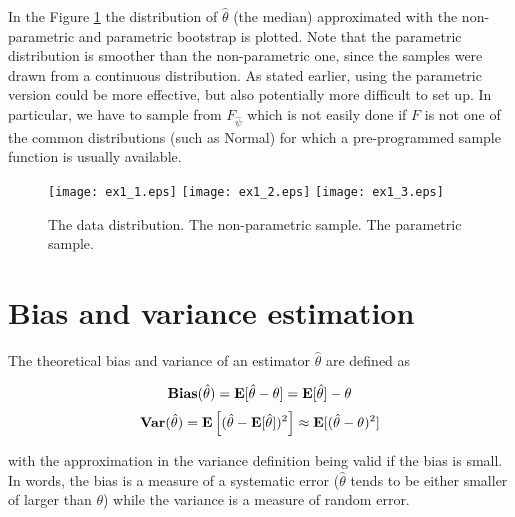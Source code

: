 \documentclass[12pt]{article}
\begin{document}
In the Figure \ref{fig:ex1_1} the distribution of $\hat{\theta}$ (the median) approximated with the non-parametric and parametric bootstrap is plotted. Note that the parametric distribution is smoother than the non-parametric one, since the samples were drawn from a continuous distribution. As stated earlier, using the parametric version could be more effective, but also potentially more difficult to set up. In particular, we have to sample from $F_{\hat{\psi}}$ which is not easily done if $F$ is not one of the common distributions (such as Normal) for which a pre-programmed sample function is usually available.


\begin{figure}[htb]
\begin{center}
\texttt{[image: ex1\_1.eps]}
\texttt{[image: ex1\_2.eps]}
\texttt{[image: ex1\_3.eps]}

\caption{The data distribution. The non-parametric sample. The parametric sample.}
\label{fig:ex1_1}
\end{center}
\end{figure}


\section{Bias and variance estimation}

The theoretical bias and variance of an estimator $\hat{\theta}$ are defined as 

\[
     \mbox{\bf Bias}(\hat{\theta})={\bf E}[\hat{\theta}-\theta]={\bf E}[\hat{\theta}]-\theta
\]
\[
     \mbox{\bf Var}(\hat{\theta})={\bf E}\left [ (\hat{
     \theta}-{\bf E}[\hat{\theta}])^2\right ]\approx {\bf E}[(\hat{
     \theta}-\theta)^2]
  \]

\noindent with the approximation in the variance definition being valid if the bias is small. In words, the bias is a measure of a systematic error ($\hat{\theta}$ tends to be either smaller of larger than $\theta$) while the variance is a measure of random error.
\end{document}
